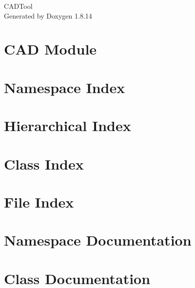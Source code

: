 \documentclass[twoside]{book}
\newcommand{\+}{\discretionary{\mbox{\scriptsize$\hookleftarrow$}}{}{}}
\newcommand{\clearemptydoublepage}{%
  \newpage{\pagestyle{empty}\cleardoublepage}%
}
\begin{document}
\hypersetup{pageanchor=false,
             bookmarksnumbered=true,
             pdfencoding=unicode
            }
\begin{titlepage}
\vspace*{7cm}
\begin{center}%
{\Large C\+A\+D\+Tool }\\
\vspace*{1cm}
{\large Generated by Doxygen 1.8.14}\\
\end{center}
\end{titlepage}
\clearemptydoublepage
{}
\tableofcontents
\clearemptydoublepage
{}
\hypersetup{pageanchor=true}

\chapter{C\+AD Module}
\label{md__readme}

\chapter{Namespace Index}

\chapter{Hierarchical Index}

\chapter{Class Index}

\chapter{File Index}

\chapter{Namespace Documentation}


\chapter{Class Documentation}
































\end{document}
